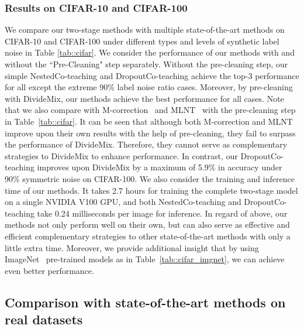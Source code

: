 \documentclass[journal]{IEEEtran}
\begin{document}
\subsubsection{Results on CIFAR-10 and CIFAR-100~\cite{krizhevsky2009learning}}
We compare our two-stage methods with multiple state-of-the-art methods on CIFAR-10 and CIFAR-100 under different types and levels of synthetic label noise in Table \ref{tab::cifar}.
We consider the performance of our methods with and without the ``Pre-Cleaning" step separately.
Without the pre-cleaning step, our simple NestedCo-teaching and DropoutCo-teaching achieve the top-3 performance for all except the extreme 90\% label noise ratio cases.
Moreover, by pre-cleaning with DivideMix, our methods achieve the best performance for all cases.
Note that we also compare with M-correction~\cite{arazo2019unsupervised} and MLNT~\cite{li2019learning} with the pre-cleaning step in Table~\ref{tab::cifar}.
It can be seen that although both M-correction and MLNT improve upon their own results with the help of pre-cleaning, they fail to surpass the performance of DivideMix.
Therefore, they cannot serve as complementary strategies to DivideMix to enhance performance.
In contrast, our DropoutCo-teaching improves upon DivideMix by a maximum of 5.9\% in accuracy under 90\% symmetric noise on CIFAR-100.
We also consider the training and inference time of our methods. 
It takes 2.7 hours for training the complete two-stage model on a single NVIDIA V100 GPU, and both NestedCo-teaching and DropoutCo-teaching take 0.24 milliseconds per image for inference.
In regard of above, our methods not only perform well on their own, but can also serve as effective and efficient complementary strategies to other state-of-the-art methods with only a little extra time.
Moreover, we provide additional insight that by using ImageNet~\cite{deng2009imagenet} pre-trained models as in Table~\ref{tab::cifar_imgnet}, we can achieve even better performance.


\subsection{Comparison with state-of-the-art methods on real datasets}
\label{sec:compare}
\end{document}
